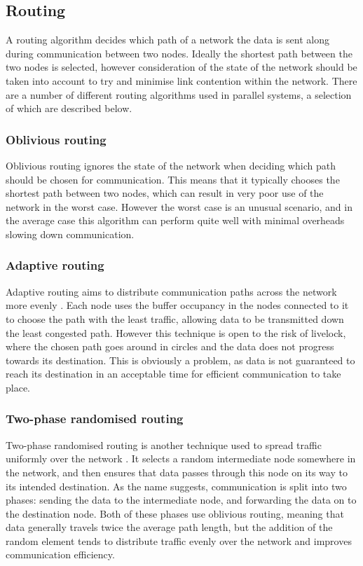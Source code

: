 \documentclass[a4paper, 12pt]{article}
\begin{document}
\subsection{Routing}

A routing algorithm decides which path of a network the data is sent along during communication between two nodes. Ideally the shortest path between the two nodes is selected, however consideration of the state of the network should be taken into account to try and minimise link contention within the network. There are a number of different routing algorithms used in parallel systems, a selection of which are described below.

\subsubsection{Oblivious routing}

Oblivious routing ignores the state of the network when deciding which path should be chosen for communication. This means that it typically chooses the shortest path between two nodes, which can result in very poor use of the network in the worst case. However the worst case is an unusual scenario, and in the average case this algorithm can perform quite well with minimal overheads slowing down communication.

\subsubsection{Adaptive routing}

Adaptive routing aims to distribute communication paths across the network more evenly \cite{Dal03}. Each node uses the buffer occupancy in the nodes connected to it to choose the path with the least traffic, allowing data to be transmitted down the least congested path. However this technique is open to the risk of livelock, where the chosen path goes around in circles and the data does not progress towards its destination. This is obviously a problem, as data is not guaranteed to reach its destination in an acceptable time for efficient communication to take place.

\subsubsection{Two-phase randomised routing}

Two-phase randomised routing is another technique used to spread traffic uniformly over the network \cite{Val90}. It selects a random intermediate node somewhere in the network, and then ensures that data passes through this node on its way to its intended destination. As the name suggests, communication is split into two phases: sending the data to the intermediate node, and forwarding the data on to the destination node. Both of these phases use oblivious routing, meaning that data generally travels twice the average path length, but the addition of the random element tends to distribute traffic evenly over the network and improves communication efficiency.
\end{document}
